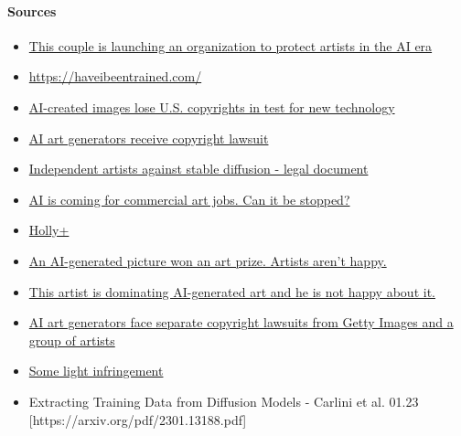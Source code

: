 \paragraph{Sources}
\begin{itemize}
    \item \href{https://www.inverse.com/input/culture/mat-dryhurst-holly-herndon-artists-ai-spawning-source-dall-e-midjourney}{This couple is launching an organization to protect artists in the AI era}
    \item \url{https://haveibeentrained.com/}
    \item \href{https://www.reuters.com/legal/ai-created-images-lose-us-copyrights-test-new-technology-2023-02-22/#:~:text=AI\%2Dcreated\%20images\%20lose\%20U.S.\%20copyrights\%20in\%20test\%20for\%20new\%20technology,-By\%20Blake\%20Brittain&text=Feb\%2022\%20(Reuters)\%20\%2D\%20Images,a\%20letter\%20seen\%20by\%20Reuters.}{AI-created images lose U.S. copyrights in test for new technology}
    \item \href{https://www.thedailystar.net/tech-startup/news/ai-art-generators-receive-copyright-lawsuit-3222706}{AI art generators receive copyright lawsuit}
    \item \href{https://stablediffusionlitigation.com/pdf/00201/1-1-stable-diffusion-complaint.pdf}{Independent artists against stable diffusion - legal document}
    \item \href{https://www.forbes.com/sites/robsalkowitz/2022/09/16/ai-is-coming-for-commercial-art-jobs-can-it-be-stopped/}{AI is coming for commercial art jobs. Can it be stopped?}
    \item \href{https://www.hollyherndon.com/holly}{Holly+}
    \item \href{https://www.nytimes.com/2022/09/02/technology/ai-artificial-intelligence-artists.html}{An AI-generated picture won an art prize. Artists aren't happy.}
    \item \href{https://www.technologyreview.com/2022/09/16/1059598/this-artist-is-dominating-ai-generated-art-and-hes-not-happy-about-it/}{This artist is dominating AI-generated art and he is not happy about it.}
    \item \href{https://www.businessinsider.com/ai-art-artists-getty-images-lawsuits-stable-diffusion-2023-1?op=1}{AI art generators face separate copyright lawsuits from Getty Images and a group of artists}
    \item \href{https://ceoln.wordpress.com/2022/12/16/some-light-infringement/}{Some light infringement}
    \item Extracting Training Data from Diffusion Models - Carlini et al. 01.23 [https://arxiv.org/pdf/2301.13188.pdf]

\end{itemize}
